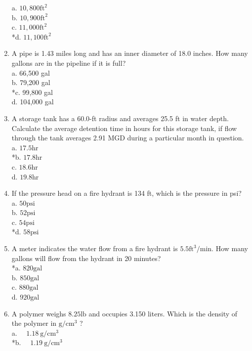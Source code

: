 \begin{enumerate}
a. $10,800 \mathrm{ft}^{2}$\\
b. $10,900 \mathrm{ft}^{2}$\\
c. $11,000 \mathrm{ft}^{2}$\\
*d. $11,100 \mathrm{ft}^{2}$\\
  \item A pipe is 1.43 miles long and has an inner diameter of 18.0 inches. How many gallons are in the pipeline if it is full?\\
a. 66,500 gal\\
b. 79,200 gal\\
*c. 99,800 gal\\
d. 104,000 gal\\
  \item A storage tank has a 60.0-ft radius and averages 25.5 ft in water depth. Calculate the average detention time in hours for this storage tank, if flow through the tank averages 2.91 MGD during a particular month in question.\\
a. $17.5 \mathrm{hr}$\\
*b. $17.8 \mathrm{hr}$\\
c. $18.6 \mathrm{hr}$\\
d. $19.8 \mathrm{hr}$ \\
\item If the pressure head on a fire hydrant is 134 ft, which is the pressure in psi?\\
a. $50 \mathrm{psi}$\\
b. $52 \mathrm{psi}$\\
c. $54 \mathrm{psi}$\\
*d. $58 \mathrm{psi}$\\
  \item A meter indicates the water flow from a fire hydrant is $5.5 \mathrm{ft}^{3} / \mathrm{min}$. How many gallons will flow from the hydrant in 20 minutes?\\
*a. $820 \mathrm{gal}$\\
b. $850 \mathrm{gal}$\\
c. $880 \mathrm{gal}$\\
d. $920 \mathrm{gal}$\\
  \item A polymer weighs $8.25 \mathrm{lb}$ and occupies 3.150 liters. Which is the density of the polymer in $\mathrm{g} / \mathrm{cm}^{3}$ ?\\
a. $\quad 1.18 \mathrm{~g} / \mathrm{cm}^{3}$\\
*b. $\quad 1.19 \mathrm{~g} / \mathrm{cm}^{3}$\\

\end{enumerate}
